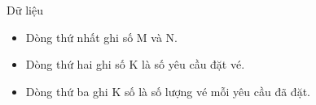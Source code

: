 Dữ liệu
\begin{itemize}
	\item     Dòng thứ nhất ghi số M và N.   
	\item     Dòng thứ hai ghi số K là số yêu cầu đặt vé.   
	\item     Dòng thứ ba ghi K số là số lượng vé mỗi yêu cầu đã đặt.   
\end{itemize}